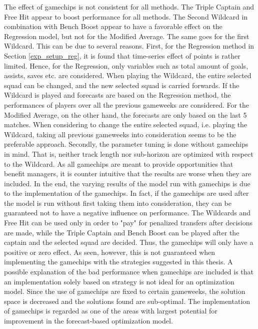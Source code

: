 The effect of gamechips is not consistent for all methods. The Triple Captain and Free Hit appear to boost performance for all methods. The Second Wildcard in combination with Bench Boost appear to have a favorable effect on the Regression model, but not for the Modified Average. The same goes for the first Wildcard. This can be due to several reasons. First, for the Regression method in Section \ref{exp_setup_reg}, it is found that time-series effect of points is rather limited. Hence, for the Regression, only variables such as total amount of goals, assists, saves etc. are considered. When playing the Wildcard, the entire selected squad can be changed, and the new selected squad is carried forwards. If the Wildcard is played and forecasts are based on the Regression method, the performances of players over all the previous gameweeks are considered. For the Modified Average, on the other hand, the forecasts are only based on the last 5 matches. When considering to change the entire selected squad, i.e. playing the Wildcard, taking  all previous gameweeks into consideration seems to be the preferable approach. Secondly, the parameter tuning is done without gamechips in mind. That is, neither track length nor sub-horizon are optimized with respect to the Wildcard. As all gamechips are meant to provide opportunities that benefit managers, it is counter intuitive that the results are worse when they are included. In the end, the varying results of the model run with gamechips is due to the implementation of the gamechips. In fact, if the gamechips are used after the model is run without first taking them into consideration, they can be guaranteed not to have a negative influence on performance. The Wildcards and Free Hit can be used only in order to "pay" for penalized transfers after decisions are made, while the Triple Captain and Bench Boost can be played after the captain and the selected squad are decided. Thus, the gamechips will only have a positive or zero effect. As seen, however, this is not guaranteed when implementing the gamechips with the strategies suggested in this thesis. A possible explanation of the bad performance when gamechips are included is that an implementation solely based on strategy is not ideal for an optimization model. Since the use of gamechips are fixed to certain gameweeks, the solution space is decreased and the solutions found are sub-optimal. The implementation of gamechips is regarded as one of the areas with largest potential for improvement in the forecast-based optimization model.


